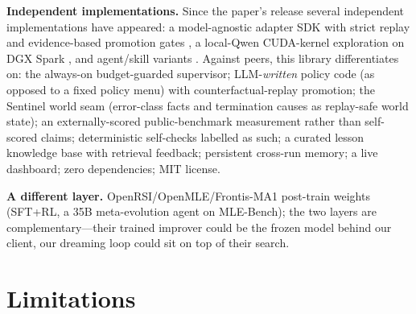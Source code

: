 \documentclass[11pt,a4paper]{article}
\newcommand{\hdr}[1]{\textbf{#1}}
\begin{document}
\hdr{Independent implementations.} Since the paper's release several
independent implementations have appeared: a model-agnostic adapter SDK with
strict replay and evidence-based promotion gates \cite{drsdk}, a local-Qwen
CUDA-kernel exploration on DGX Spark \cite{dspark}, and agent/skill variants
\cite{hermesdrsi}. Against peers, this library differentiates on: the
always-on budget-guarded supervisor; LLM-\emph{written} policy code (as
opposed to a fixed policy menu) with counterfactual-replay promotion; the
Sentinel world seam (error-class facts and termination causes as replay-safe
world state); an externally-scored public-benchmark measurement rather than
self-scored claims; deterministic self-checks labelled as such; a curated
lesson knowledge base with retrieval feedback; persistent cross-run memory; a
live dashboard; zero dependencies; MIT license.

\hdr{A different layer.} OpenRSI/OpenMLE/Frontis-MA1 \cite{openrsi,
mlebench} post-train weights (SFT+RL, a 35B meta-evolution agent on
MLE-Bench); the two layers are complementary---their trained improver could
be the frozen model behind our client, our dreaming loop could sit on top of
their search.

\section{Limitations}
\label{sec:limits}
\end{document}
